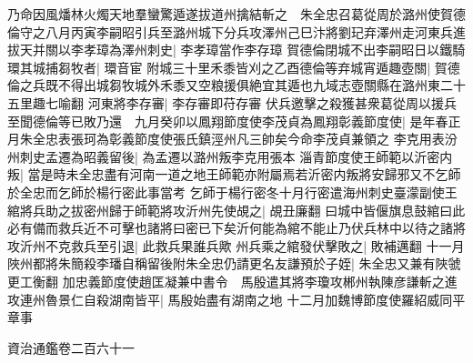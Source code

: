 乃命因風燔林火燭天地羣蠻驚遁遂拔道州擒結斬之　朱全忠召葛從周於潞州使賀德倫守之八月丙寅李嗣昭引兵至潞州城下分兵攻澤州己巳汴將劉玘弃澤州走河東兵進拔天并關以李孝璋為澤州刺史|{
	李孝璋當作李存璋}
賀德倫閉城不出李嗣昭日以鐵騎環其城捕芻牧者|{
	環音宦}
附城三十里禾黍皆刈之乙酉德倫等弃城宵遁趣壺關|{
	賀德倫之兵既不得出城芻牧城外禾黍又空粮援俱絶宜其遁也九域志壺關縣在潞州東二十五里趣七喻翻}
河東將李存審|{
	李存審即苻存審}
伏兵邀擊之殺獲甚衆葛從周以援兵至聞德倫等已敗乃還　九月癸卯以鳳翔節度使李茂貞為鳳翔彰義節度使|{
	是年春正月朱全忠表張珂為彰義節度使張氏鎮涇州凡三帥矣今命李茂貞兼領之}
李克用表汾州刺史孟遷為昭義留後|{
	為孟遷以潞州叛李克用張本}
淄青節度使王師範以沂密内叛|{
	當是時未全忠盡有河南一道之地王師範亦附屬焉若沂密内叛將安歸邪又不乞師於全忠而乞師於楊行密此事當考}
乞師于楊行密冬十月行密遣海州刺史臺濛副使王綰將兵助之拔密州歸于師範將攻沂州先使覘之|{
	覘丑廉翻}
曰城中皆偃旗息鼓綰曰此必有備而救兵近不可擊也諸將曰密已下矣沂何能為綰不能止乃伏兵林中以待之諸將攻沂州不克救兵至引退|{
	此救兵果誰兵歟}
州兵乘之綰發伏擊敗之|{
	敗補邁翻}
十一月陜州都將朱簡殺李璠自稱留後附朱全忠仍請更名友謙預於子姪|{
	朱全忠又兼有陜虢更工衡翻}
加忠義節度使趙匡凝兼中書令　馬殷遣其將李瓊攻郴州執陳彦謙斬之進攻連州魯景仁自殺湖南皆平|{
	馬殷始盡有湖南之地}
十二月加魏博節度使羅紹威同平章事

資治通鑑卷二百六十一
